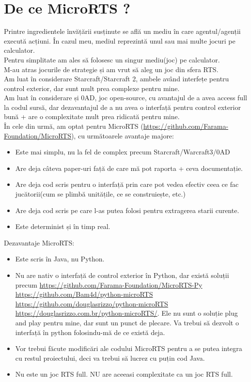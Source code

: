 \documentclass[12pt]{article}
\begin{document}
\section{De ce MicroRTS ?}
    Printre ingredientele învățării susținute se află un mediu în care agentul/agenții execută acțiuni. În cazul meu, mediul reprezintă unul sau mai multe jocuri pe calculator. \\
    Pentru simplitate am ales să folosesc un singur mediu(joc) pe calculator. \\
    M-au atras jocurile de strategie și am vrut să aleg un joc din sfera RTS. \\
    Am luat în considerare Starcraft/Starcraft 2, ambele având interfețe pentru control exterior, dar sunt mult prea complexe pentru mine. \\
    Am luat în considerare și 0AD, joc open-source, cu avantajul de a avea access full la codul sursă, dar dezavantajul de a nu avea o interfață pentru control exterior bună + are o complexitate mult prea ridicată pentru mine. \\
    În cele din urmă, am optat pentru MicroRTS (\url{https://github.com/Farama-Foundation/MicroRTS}), cu următoarele avantaje majore:
    \begin{itemize}
        \item Este mai simplu, nu la fel de complex precum Starcraft/Warcraft3/0AD
        \item Are deja câteva paper-uri față de care mă pot raporta + ceva documentație.
        \item Are deja cod scris pentru o interfață prin care pot vedea efectiv ceea ce fac jucătorii(cum se plimbă unitățile, ce se construiește, etc.)
        \item Are deja cod scris pe care l-as putea folosi pentru extragerea starii curente.
        \item Este determinist și în timp real.
    \end{itemize}
    Dezavantaje MicroRTS:
    \begin{itemize}
        \item Este scris în Java, nu Python.
        \item Nu are nativ o interfață de control exterior în Python, dar există soluții precum \url{https://github.com/Farama-Foundation/MicroRTS-Py} \url{https://github.com/Bam4d/python-microRTS} \url{https://github.com/douglasrizzo/python-microRTS} \url{https://douglasrizzo.com.br/python-microRTS/}. Ele nu sunt o soluție plug and play pentru mine, dar sunt un punct de plecare. Va trebui să dezvolt o interfață în python folosindu-mă de ce există deja.
        \item Vor trebui făcute modificări ale codului MicroRTS pentru a se putea integra cu restul proiectului, deci va trebui să lucrez cu puțin cod Java.
        \item Nu este un joc RTS full. NU are aceeasi complexitate ca un joc RTS full.
    \end{itemize}
\end{document}
